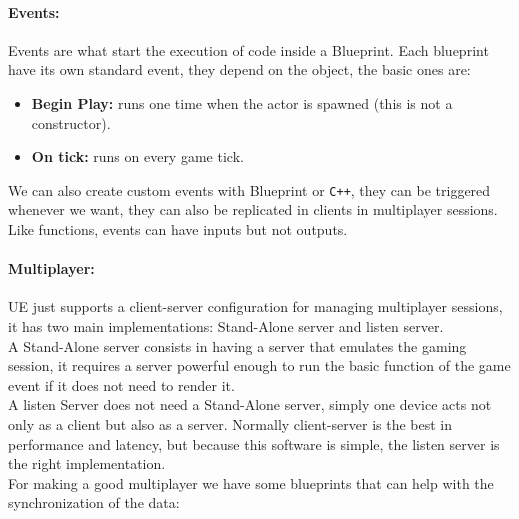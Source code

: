 \paragraph{Events:}
Events are what start the execution of code inside a Blueprint. Each blueprint have its own standard event, they depend on the object, the basic ones are:
\begin{itemize}
  \item \textbf{Begin Play:} runs one time when the actor is spawned (this is not a constructor).
  \item \textbf{On tick:} runs on every game tick.
\end{itemize}
\noindent
We can also create custom events with Blueprint or \texttt{C++}, they can be triggered whenever we want, they can also be replicated in clients in multiplayer sessions. 
Like functions, events can have inputs but not outputs.

\paragraph{Multiplayer:}
\ac{UE} just supports a client-server configuration for managing multiplayer sessions, it has two main implementations: Stand-Alone server and listen server.\\
A Stand-Alone server consists in having a server that emulates the gaming session, it requires a server powerful enough to run the basic function of the game event if it does not need to render it.\\
A listen Server does not need a Stand-Alone server, simply one device acts not only as a client but also as a server. Normally client-server is the best in performance and latency, but because this software is simple, the listen server is the right implementation.\\
For making a good multiplayer we have some blueprints that can help with the synchronization of the data: 

